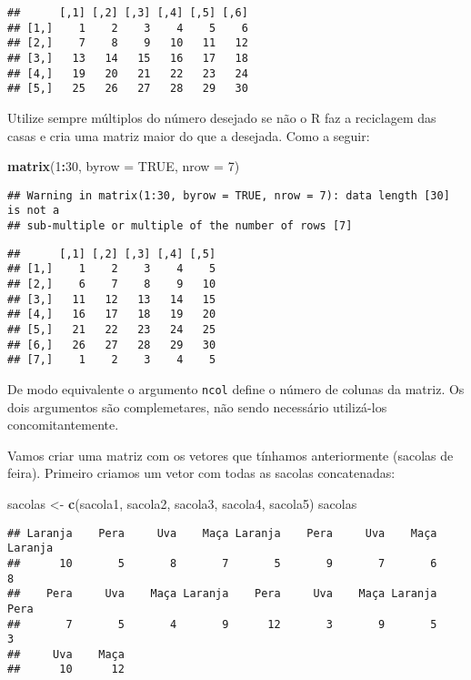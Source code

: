 \documentclass[]{book}
\newenvironment{Shaded}{\begin{snugshade}}{\end{snugshade}}
\newcommand{\DataTypeTok}[1]{\textcolor[rgb]{0.13,0.29,0.53}{#1}}
\newcommand{\DecValTok}[1]{\textcolor[rgb]{0.00,0.00,0.81}{#1}}
\newcommand{\KeywordTok}[1]{\textcolor[rgb]{0.13,0.29,0.53}{\textbf{#1}}}
\newcommand{\NormalTok}[1]{#1}
\newcommand{\OperatorTok}[1]{\textcolor[rgb]{0.81,0.36,0.00}{\textbf{#1}}}
\newcommand{\OtherTok}[1]{\textcolor[rgb]{0.56,0.35,0.01}{#1}}
\newcommand{\StringTok}[1]{\textcolor[rgb]{0.31,0.60,0.02}{#1}}
\theoremstyle{definition}
\theoremstyle{definition}
\theoremstyle{definition}
\theoremstyle{remark}
\begin{document}
\begin{verbatim}
##      [,1] [,2] [,3] [,4] [,5] [,6]
## [1,]    1    2    3    4    5    6
## [2,]    7    8    9   10   11   12
## [3,]   13   14   15   16   17   18
## [4,]   19   20   21   22   23   24
## [5,]   25   26   27   28   29   30
\end{verbatim}

Utilize sempre múltiplos do número desejado se não o R faz a reciclagem das casas e cria uma matriz maior do que a desejada. Como a seguir:

\begin{Shaded}
\begin{Highlighting}[]
\KeywordTok{matrix}\NormalTok{(}\DecValTok{1}\OperatorTok{:}\DecValTok{30}\NormalTok{, }\DataTypeTok{byrow =} \OtherTok{TRUE}\NormalTok{, }\DataTypeTok{nrow =} \DecValTok{7}\NormalTok{)}
\end{Highlighting}
\end{Shaded}

\begin{verbatim}
## Warning in matrix(1:30, byrow = TRUE, nrow = 7): data length [30] is not a
## sub-multiple or multiple of the number of rows [7]
\end{verbatim}

\begin{verbatim}
##      [,1] [,2] [,3] [,4] [,5]
## [1,]    1    2    3    4    5
## [2,]    6    7    8    9   10
## [3,]   11   12   13   14   15
## [4,]   16   17   18   19   20
## [5,]   21   22   23   24   25
## [6,]   26   27   28   29   30
## [7,]    1    2    3    4    5
\end{verbatim}

De modo equivalente o argumento \texttt{ncol} define o número de colunas da matriz. Os dois argumentos são complemetares, não sendo necessário utilizá-los concomitantemente.

Vamos criar uma matriz com os vetores que tínhamos anteriormente (sacolas de feira). Primeiro criamos um vetor com todas as sacolas concatenadas:

\begin{Shaded}
\begin{Highlighting}[]
\NormalTok{sacolas <-}\StringTok{ }\KeywordTok{c}\NormalTok{(sacola1, sacola2, sacola3, sacola4, sacola5)}
\NormalTok{sacolas}
\end{Highlighting}
\end{Shaded}

\begin{verbatim}
## Laranja    Pera     Uva    Maça Laranja    Pera     Uva    Maça Laranja 
##      10       5       8       7       5       9       7       6       8 
##    Pera     Uva    Maça Laranja    Pera     Uva    Maça Laranja    Pera 
##       7       5       4       9      12       3       9       5       3 
##     Uva    Maça 
##      10      12
\end{verbatim}
\end{document}
